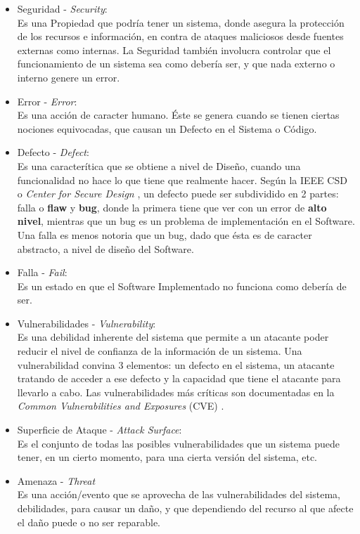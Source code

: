 \begin{itemize}
	\item Seguridad - \textit{Security}:
		\\Es una Propiedad que podría tener un sistema, donde asegura la protección de los recursos e información, en contra de ataques maliciosos desde fuentes externas como internas. La Seguridad también involucra controlar que el funcionamiento de un sistema sea como debería ser, y que nada externo o interno genere un error.
	\item Error - \textit{Error}:
		\\Es una acción de caracter humano. Éste se genera cuando se tienen ciertas nociones equivocadas, que causan un Defecto en el Sistema o Código.
	\item Defecto  - \textit{Defect}:
		\\Es una caracterítica que se obtiene a nivel de Diseño, cuando una funcionalidad no hace lo que tiene que realmente hacer. Según la IEEE CSD o \textit{Center for Secure Design} \cite{ieeecsd2}, un defecto puede ser subdividido en 2 partes: falla o \textbf{flaw} y \textbf{bug}, donde la primera tiene que ver con un error de \textbf{alto nivel}, mientras que un bug es un problema de implementación en el Software. Una falla es menos notoria que un bug, dado que ésta es de caracter abstracto, a nivel de diseño del Software.
	\item Falla - \textit{Fail}:
		\\Es un estado en que el Software Implementado no funciona como debería de ser.
	\item Vulnerabilidades - \textit{Vulnerability}:
		\\Es una debilidad inherente del sistema que permite a un atacante poder reducir el nivel de confianza de la información de un sistema. Una vulnerabilidad convina 3 elementos: un defecto en el sistema, un atacante tratando de acceder a ese defecto y la capacidad que tiene el atacante para llevarlo a cabo. Las vulnerabilidades más críticas son documentadas en la \textit{Common Vulnerabilities and Exposures} (CVE) \cite{cve}.
	\item Superficie de Ataque - \textit{Attack Surface}:
		\\Es el conjunto de todas las posibles vulnerabilidades que un sistema puede tener, en un cierto momento, para una cierta versión del sistema, etc.
	\item Amenaza - \textit{Threat}
		\\Es una acción/evento que se aprovecha de las vulnerabilidades del sistema, debilidades, para causar un daño, y que dependiendo del recurso al que afecte el daño puede o no ser reparable.

\end{itemize}
